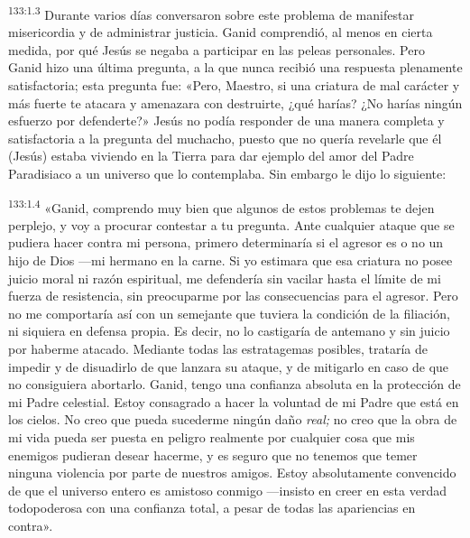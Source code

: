 \par 
\textsuperscript{133:1.3} Durante varios días conversaron sobre este problema de manifestar misericordia y de administrar justicia. Ganid comprendió, al menos en cierta medida, por qué Jesús se negaba a participar en las peleas personales. Pero Ganid hizo una última pregunta, a la que nunca recibió una respuesta plenamente satisfactoria; esta pregunta fue: «Pero, Maestro, si una criatura de mal carácter y más fuerte te atacara y amenazara con destruirte, ¿qué harías? ¿No harías ningún esfuerzo por defenderte?» Jesús no podía responder de una manera completa y satisfactoria a la pregunta del muchacho, puesto que no quería revelarle que él (Jesús) estaba viviendo en la Tierra para dar ejemplo del amor del Padre Paradisiaco a un universo que lo contemplaba. Sin embargo le dijo lo siguiente:

\par 
\textsuperscript{133:1.4} «Ganid, comprendo muy bien que algunos de estos problemas te dejen perplejo, y voy a procurar contestar a tu pregunta. Ante cualquier ataque que se pudiera hacer contra mi persona, primero determinaría si el agresor es o no un hijo de Dios ---mi hermano en la carne. Si yo estimara que esa criatura no posee juicio moral ni razón espiritual, me defendería sin vacilar hasta el límite de mi fuerza de resistencia, sin preocuparme por las consecuencias para el agresor. Pero no me comportaría así con un semejante que tuviera la condición de la filiación, ni siquiera en defensa propia. Es decir, no lo castigaría de antemano y sin juicio por haberme atacado. Mediante todas las estratagemas posibles, trataría de impedir y de disuadirlo de que lanzara su ataque, y de mitigarlo en caso de que no consiguiera abortarlo. Ganid, tengo una confianza absoluta en la protección de mi Padre celestial. Estoy consagrado a hacer la voluntad de mi Padre que está en los cielos. No creo que pueda sucederme ningún daño \textit{real;} no creo que la obra de mi vida pueda ser puesta en peligro realmente por cualquier cosa que mis enemigos pudieran desear hacerme, y es seguro que no tenemos que temer ninguna violencia por parte de nuestros amigos. Estoy absolutamente convencido de que el universo entero es amistoso conmigo ---insisto en creer en esta verdad todopoderosa con una confianza total, a pesar de todas las apariencias en contra».

